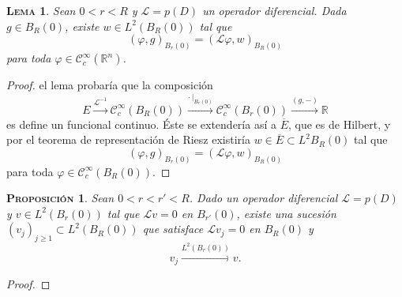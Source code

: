\documentclass[11pt]{article}
\theoremstyle{colored}
\newtheorem{proposition}{\scshape Proposición}
\newtheorem{lemma}{\scshape Lema}
\newcommand{\R}{\mathbb{R}}
\newcommand{\C}{\mathscr{C}}
\renewcommand{\L}{\mathscr{L}}
\begin{document}
\begin{lemma} Sean $0 < r < R$ y $\L = p(D)$ un operador diferencial. Dada $g \in B_R(0)$, existe $w\in L^2(B_R(0))$ tal que
\[
(\varphi,g)_{B_r(0)} = (\L \varphi, w)_{B_R(0)}
\]
para toda $\varphi \in \C_c^\infty(\R^n)$.
\end{lemma}
\begin{proof} el lema probaría que la composición
\[
E \xrightarrow{\L^{-1}} \C_c^\infty(B_R(0)) \xrightarrow{\cdot \ |_{B_r(0)}} \C_c^\infty(B_r(0)) \xrightarrow{(g,-)}  \R
\]
es define un funcional continuo. Éste se extendería así a $\overline{E}$, que es de Hilbert, y por el teorema de representación de Riesz existiría $w \in \overline{E} \subset L^2{B_R(0)}$ tal que
\[
(\varphi,g)_{B_r(0)} = (\L \varphi, w)_{B_R(0)}
\]
para toda $\varphi \in \C_c^\infty(B_R(0))$.  
\end{proof}

\begin{proposition} \label{aprox} Sean $0 < r < r' < R$. Dado un operador diferencial $\L = p(D)$ y $v \in L^2(B_r(0))$ tal que $\L v = 0$ en $B_{r'}(0)$, existe una sucesión $(v_j)_{j \geq 1} \subset L^2(B_R(0))$ que satisface $\L v_j = 0$ en $B_R(0)$ y 
\[
v_j \xrightarrow{L^2(B_r(0))} v.
\]
\end{proposition}
\begin{proof} 
\end{proof}
\end{document}
